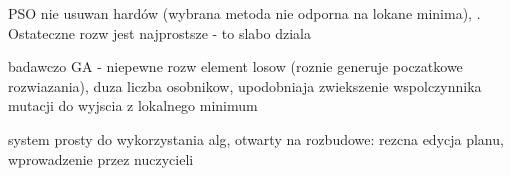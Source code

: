 \label{etykietka}
\par PSO nie usuwan hardów (wybrana metoda nie odporna na lokane minima), . Ostateczne rozw jest najprostsze - to slabo dziala
\par badawczo 
GA - niepewne rozw element losow (roznie generuje poczatkowe rozwiazania), duza liczba osobnikow, upodobniaja zwiekszenie wspolczynnika mutacji do wyjscia z lokalnego minimum
\par system prosty do wykorzystania alg, otwarty na rozbudowe: rezcna edycja planu, wprowadzenie przez nuczycieli 







